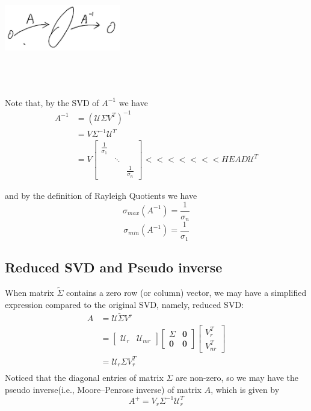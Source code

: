 \begin{marginfigure}
	\centering
	\includegraphics[width=2in,height=2in]{figures/ch05/figure2.jpg}
\end{marginfigure}

Note that, by the SVD of $A^{-1}$ we have
\begin{align*}
A^{-1} 
&= (\mathcal{U}\Sigma V^T)^{-1} \\
&= V\Sigma^{-1}\mathcal{U}^T\\
&= V
\begin{bmatrix}
\frac{1}{\sigma_1} & &\\
& \ddots & \\
& & \frac{1}{\sigma_n}
\end{bmatrix}
<<<<<<< HEAD
\mathcal{U}^T
\end{align*}

and by the definition of Rayleigh Quotients we have 
$$\sigma_{max}(A^{-1}) = \frac{1}{\sigma_n}$$
$$\sigma_{min}(A^{-1}) = \frac{1}{\sigma_1}$$

\subsection{Reduced SVD and Pseudo inverse}
When matrix $\tilde{\Sigma}$ contains a zero row (or column) vector, we may have a simplified expression compared to the original SVD, namely, reduced SVD:
\begin{align*}
A &= \mathcal{U}\tilde{\Sigma}V^r\\
&= 
\begin{bmatrix}
\mathcal{U}_r & \mathcal{U}_{mr}
\end{bmatrix}
\begin{bmatrix}
\Sigma & \mathbf{0}\\
\mathbf{0} & \mathbf{0}
\end{bmatrix}
\begin{bmatrix}
V_r^T\\
V_{nr}^T
\end{bmatrix}\\
&= \mathcal{U}_r\Sigma V_r^T\\
\end{align*}
Noticed that the diagonal entries of matrix $\Sigma$ are non-zero, so we may have the pseudo inverse(i.e., Moore–Penrose inverse) of matrix $A$, which is given by
$$A^{+} = V_r \Sigma^{-1} \mathcal{U}_r^T $$


